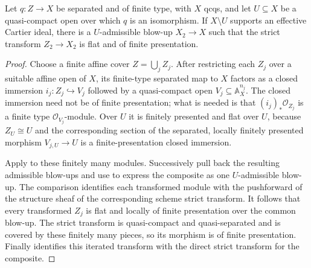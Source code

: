 \begin{lemma}
  \label{lemma:nagata-flattening-after-cartier-boundary}

  Let $q\colon Z\to X$ be separated and of finite type, with $X$ qcqs, and
  let $U\subseteq X$ be a quasi-compact open over which $q$ is an
  isomorphism.  If $X\setminus U$ supports an effective
  Cartier ideal, there is a $U$-admissible blow-up $X_2\to X$ such that the
  strict transform $Z_2\to X_2$ is flat and of finite presentation.
\end{lemma}

\begin{proof}
  Choose a finite affine cover $Z=\bigcup_j Z_j$.  After restricting each
  $Z_j$ over a suitable affine open of $X$, its finite-type separated map to
  $X$ factors as a closed immersion
  $i_j\colon Z_j\hookrightarrow V_j$ followed by a quasi-compact open
  $V_j\subseteq\mathbb A_X^{n_j}$.  The closed immersion need not be of finite
  presentation; what is needed is that $(i_j)_*\mathcal O_{Z_j}$ is a finite
  type $\mathcal O_{V_j}$-module.  Over $U$ it is finitely presented and flat
  over $U$, because $Z_U\cong U$ and the corresponding section of the
  separated, locally finitely presented morphism $V_{j,U}\to U$ is a
  finite-presentation closed immersion.

  Apply  to these finitely many
  modules.  Successively pull back the resulting admissible blow-ups and use
   to express the composite as one
  $U$-admissible blow-up.  The comparison
   identifies
  each transformed module with the pushforward of the structure sheaf of the
  corresponding scheme strict transform.  It follows that every transformed
  $Z_j$ is flat and locally of finite presentation over the common blow-up.
  The strict transform is quasi-compact and quasi-separated and is covered by
  these finitely many pieces, so its morphism is of finite presentation.
  Finally  identifies this
  iterated transform with the direct strict transform for the composite.
\end{proof}

